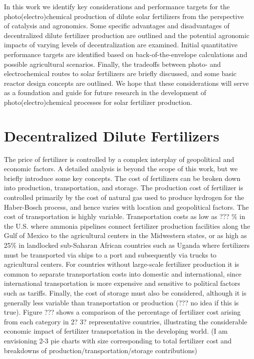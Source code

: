 In this work we identify key considerations and performance targets for the photo(electro)chemical production of dilute solar fertilizers from the perspective of catalysis and agronomics. Some specific advantages and disadvantages of decentralized dilute fertilizer production are outlined and the potential agronomic impacts of varying levels of decentralization are examined. Initial quantitative performance targets are identified based on back-of-the-envelope calculations and possible agricultural scenarios. Finally, the tradeoffs between photo- and electrochemical routes to solar fertilizers are briefly discussed, and some basic reactor design concepts are outlined. We hope that these considerations will serve as a foundation and guide for future research in the development of photo(electro)chemical processes for solar fertilizer production.

\section{Decentralized Dilute Fertilizers}

The price of fertilizer is controlled by a complex interplay of geopolitical and economic factors. A detailed analysis is beyond the scope of this work, but we briefly introduce some key concepts. The cost of fertilizers can be broken down into production, transportation, and storage. The production cost of fertilizer is controlled primarily by the cost of natural gas used to produce hydrogen for the Haber-Bosch process, and hence varies with location and geopolitical factors. The cost of transportation is highly variable. Transportation costs as low as ??? \% in the U.S. where ammonia pipelines connect fertilizer production facilities along the Gulf of Mexico to the agricultural centers in the Midwestern states, or as high as 25\% in landlocked sub-Saharan African countries such as Uganda where fertilizers must be transported via ships to a port and subsequently via trucks to agricultural centers. For countries without large-scale fertilizer production it is common to separate transportation costs into domestic and international, since international transportation is more expensive and sensitive to political factors such as tariffs. Finally, the cost of storage must also be considered, although it is generally less variable than transportation or production (??? no idea if this is true). Figure ??? shows a comparison of the percentage of fertilizer cost arising from each category in 2? 3? representative countries, illustrating the considerable economic impact of fertilizer transportation in the developing world. (I am envisioning 2-3 pie charts with size corresponding to total fertilizer cost and breakdowns of production/transportation/storage contributions)

